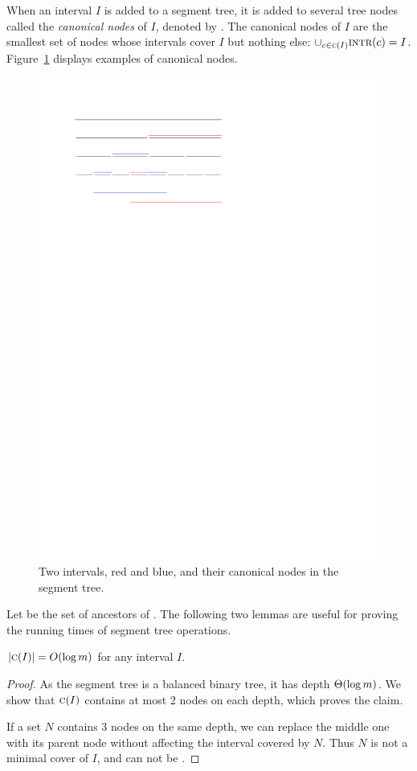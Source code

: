 \documentclass[english,gradu]{tktltiki2018}
\begin{document}
When an interval $I$ is added to a segment tree, it is added to several tree nodes called the \emph{canonical nodes} of $I$, denoted by .
The canonical nodes of $I$ are the smallest set of nodes whose intervals cover $I$ but nothing else: $\cup_{c\in\textsc{c}(I)} \textsc{intr}(c)=I$.
Figure~\ref{fig:canon} displays examples of canonical nodes.

\begin{figure}\centering
	\includegraphics[scale=0.7,page=1]{fig/canon}
	\caption{Two intervals, red and blue, and their canonical nodes in the segment tree.}\label{fig:canon}
\end{figure}

Let  be the set of ancestors of .
The following two lemmas are useful for proving the running times of segment tree operations.

\begin{lem}\label{lem:canonlog}$\left |\textsc{c}(I)\right |=O(\log m)$ for any interval $I$.\end{lem}
\begin{proof}
As the segment tree is a balanced binary tree, it has depth $\Theta(\log m)$.
We show that $\textsc{c}(I)$ contains at most 2 nodes on each depth, which proves the claim.

If a set $N$ contains 3 nodes on the same depth, we can replace the middle one with its parent node without affecting the interval covered by $N$.
Thus $N$ is not a minimal cover of $I$, and can not be .
\end{proof}
\end{document}
